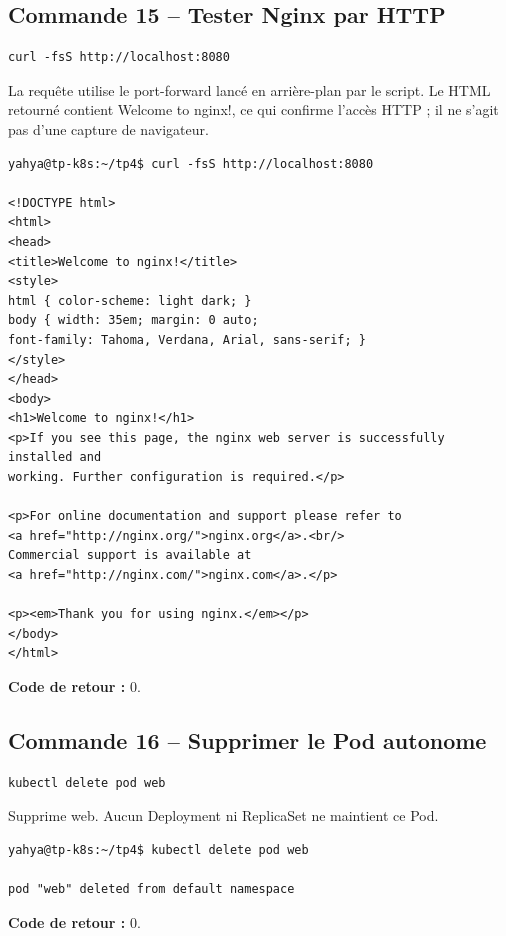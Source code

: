 \documentclass[11pt,a4paper]{article}
\begin{document}
\subsection{Commande 15 -- Tester Nginx par HTTP}
\begin{lstlisting}
curl -fsS http://localhost:8080
\end{lstlisting}
La requête utilise le port-forward lancé en arrière-plan par le script. Le HTML retourné contient Welcome to nginx!, ce qui confirme l’accès HTTP ; il ne s’agit pas d’une capture de navigateur.
\begin{tcolorbox}[terminal,title={Ubuntu / WSL2 -- Commande 15 -- rendu reconstitué}]
\begin{Verbatim}[fontsize=\scriptsize,breaklines=true,breakanywhere=true,breaksymbolleft={},breaksymbolright={}]
yahya@tp-k8s:~/tp4$ curl -fsS http://localhost:8080

<!DOCTYPE html>
<html>
<head>
<title>Welcome to nginx!</title>
<style>
html { color-scheme: light dark; }
body { width: 35em; margin: 0 auto;
font-family: Tahoma, Verdana, Arial, sans-serif; }
</style>
</head>
<body>
<h1>Welcome to nginx!</h1>
<p>If you see this page, the nginx web server is successfully installed and
working. Further configuration is required.</p>

<p>For online documentation and support please refer to
<a href="http://nginx.org/">nginx.org</a>.<br/>
Commercial support is available at
<a href="http://nginx.com/">nginx.com</a>.</p>

<p><em>Thank you for using nginx.</em></p>
</body>
</html>
\end{Verbatim}
\end{tcolorbox}
\textbf{Code de retour :} 0.

\subsection{Commande 16 -- Supprimer le Pod autonome}
\begin{lstlisting}
kubectl delete pod web
\end{lstlisting}
Supprime web. Aucun Deployment ni ReplicaSet ne maintient ce Pod.
\begin{tcolorbox}[terminal,title={Ubuntu / WSL2 -- Commande 16 -- rendu reconstitué}]
\begin{Verbatim}[fontsize=\scriptsize,breaklines=true,breakanywhere=true,breaksymbolleft={},breaksymbolright={}]
yahya@tp-k8s:~/tp4$ kubectl delete pod web

pod "web" deleted from default namespace
\end{Verbatim}
\end{tcolorbox}
\textbf{Code de retour :} 0.
\end{document}
